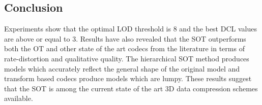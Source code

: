 \subsection{Conclusion}

Experiments show that the optimal LOD threshold is $8$ and the best DCL values are above or equal to $3$. Results have also revealed that the SOT outperforms both the OT and other state of the art codecs from the literature in terms of rate-distortion and qualitative quality. The hierarchical SOT method produces models which accurately reflect the general shape of the original model and transform based codecs produce models which are lumpy. These results suggest that the SOT is among the current state of the art 3D data compression schemes available.

